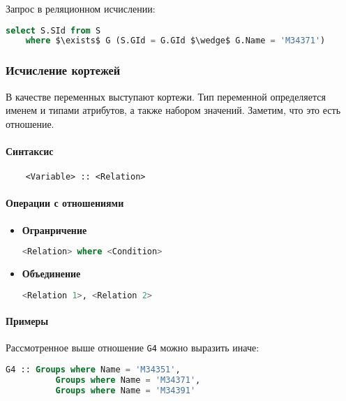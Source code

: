 Запрос в реляционном исчислении:

\begin{lstlisting}[language=SQL, mathescape=true]
    select S.SId from S
    where $\exists$ G (S.GId = G.GId $\wedge$ G.Name = 'M34371')
\end{lstlisting}

\subsubsection{Исчисление кортежей}

В качестве переменных выступают кортежи. Тип переменной определяется именем и типами атрибутов, а
также набором значений. Заметим, что это есть отношение.

\paragraph{Синтаксис}

\begin{lstlisting}
    <Variable> :: <Relation>
\end{lstlisting}

\paragraph{Операции с отношениями}

\begin{itemize}
	\item \textbf{Огранричение}
	      \begin{lstlisting}[language=SQL]
    <Relation> where <Condition>
        \end{lstlisting}
	\item \textbf{Объединение}
	      \begin{lstlisting}[language=SQL]
    <Relation 1>, <Relation 2>
        \end{lstlisting}
\end{itemize}

\paragraph{Примеры}

Рассмотренное выше отношение \texttt{G4} можно выразить иначе:

\begin{lstlisting}[language=SQL, mathescape=true]
    G4 :: Groups where Name = 'M34351',
          Groups where Name = 'M34371',
          Groups where Name = 'M34391'
\end{lstlisting}

